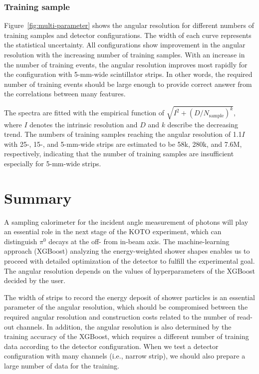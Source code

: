\documentclass[12pt,times,draftclsnofoot,a4paper]{elsarticle}
\begin{document}
\subsubsection{Training sample}
Figure~\ref{fig:multi-parameter} shows the angular resolution for different numbers of training samples and detector configurations. The width of each curve represents the statistical uncertainty. All configurations show improvement in the angular resolution with the increasing number of training samples. With an increase in the number of training events, the angular resolution improves most rapidly for the configuration with 5-mm-wide scintillator strips. In other words, the required number of training events should be large enough to provide correct answer from the correlations between many features.

The spectra are fitted with the empirical function of $\sqrt{I^{2} + (D/N_{\mathrm{sample}})^{k}}$, where $I$ denotes the intrinsic resolution and $D$ and $k$ describe the decreasing trend. The numbers of training samples reaching the angular resolution of 1.1$I$ with 25-, 15-, and 5-mm-wide strips are estimated to be 58k, 280k, and 7.6M, respectively, indicating that the number of training samples are insufficient especially for 5-mm-wide strips.

\section{Summary}
\label{sec:sum}

A sampling calorimeter for the incident angle measurement of photons will play an essential role in the next stage of the KOTO experiment, which can distinguish $\pi^0$ decays at the off- from in-beam axis. The machine-learning approach (XGBoost) analyzing the energy-weighted shower shapes enables us to proceed with detailed optimization of the detector to fulfill the experimental goal. The angular resolution depends on the values of hyperparameters of the XGBoost decided by the user.

The width of strips to record the energy deposit of shower particles is an essential parameter of the angular resolution, which should be compromised between the required angular resolution and construction costs related to the number of read-out channels. In addition, the angular resolution is also determined by the training accuracy of the XGBoost, which requires a different number of training data according to the detector configuration. When we test a detector configuration with many channels (i.e., narrow strip), we should also prepare a large number of data for the training.
\end{document}
